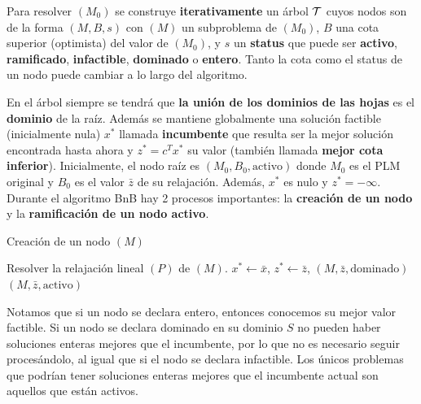     
    
    
    
    
    
    Para resolver $(M_0)$ se construye \textbf{iterativamente} un árbol $\mathcal T$ cuyos nodos son de la forma $(M,B,s)$ con $(M)$ un subproblema de $(M_0)$, $B$ una cota superior (optimista) del valor de $(M_0)$, y $s$ un \textbf{status} que puede ser \textbf{activo}, \textbf{ramificado}, \textbf{infactible}, \textbf{dominado} o \textbf{entero}. Tanto la cota como el status de un nodo puede cambiar a lo largo del algoritmo.
    
    En el árbol  siempre se tendrá que \textbf{la unión de los dominios de las hojas} es el \textbf{dominio} de la raíz. Además se mantiene globalmente una solución factible (inicialmente nula) $x^*$ llamada \textbf{incumbente} que resulta ser la mejor solución encontrada hasta ahora y $z^*=c^Tx^*$ su valor (también llamada \textbf{mejor cota inferior}).
    Inicialmente, el nodo raíz es $(M_0,B_0,\text{activo})$ donde $M_0$ es el PLM original y $B_0$ es el valor $\bar{z}$ de su relajación. Además, $x^*$ es nulo y $z^*=-\infty$. Durante el algoritmo BnB hay 2 procesos importantes: la \textbf{creación de un nodo} y la \textbf{ramificación de un nodo activo}.
    
    
    
    \begin{algorithm}[H]
    	\caption{Creación de un nodo $(M)$}
    	\label{alg:bnb}
    	\begin{algorithmic}[1] 
    		\State Resolver la relajación lineal $(P)$ de $(M)$.
    		  
    		\EndIf
    			 {} \EndIf
    			  {$x^*\gets \bar{x}$, $z^*\gets \bar{z}$,  }\EndIf
    		\EndIf
    			 {\Return $(M,\bar{z}, \text{dominado})$} \EndIf
    			 {\Return $(M,\bar{z}, \text{activo})$} \EndIf
    		\EndIf
    	
    	\end{algorithmic}
    \end{algorithm} 
    
    Notamos que si un nodo se declara entero, entonces conocemos su mejor valor factible. Si un nodo se declara dominado en su dominio $S$ no pueden haber soluciones enteras mejores que el incumbente, por lo que no es necesario seguir procesándolo, al igual que si el nodo se declara infactible. Los únicos problemas que podrían tener soluciones enteras mejores que el incumbente actual son aquellos que están activos.
    
